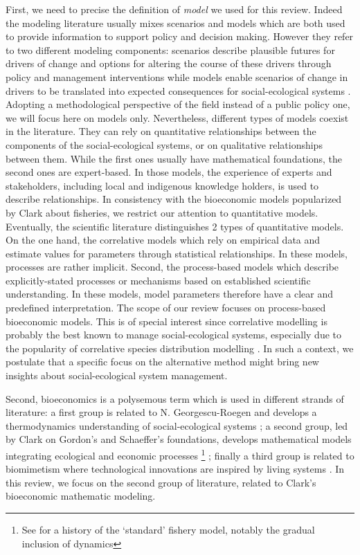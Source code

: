 First, we need to precise the definition of \textit{model} we used for this review. Indeed the modeling literature usually mixes scenarios and models which are  both used to provide information to support policy and decision making. However they refer to two different modeling components:
scenarios describe plausible futures for drivers of change and options for altering the course of these drivers through policy and management interventions while models enable scenarios of change in drivers to be
translated into expected consequences for social-ecological systems \citep{IPBES2016}. Adopting a methodological perspective of the field instead of a public policy one, we will focus here on models only. Nevertheless, different types of models coexist in the literature. They can rely on quantitative relationships between the components of the social-ecological systems, or on qualitative relationships between them. While the first ones usually have mathematical foundations, the second ones are expert-based. In those models, the experience of experts and stakeholders, including local and indigenous knowledge holders, is used to describe relationships. In consistency with the bioeconomic models popularized by Clark about fisheries, we restrict our attention to quantitative models.
Eventually, the scientific literature distinguishes 2 types of quantitative models. On the one hand, the correlative models which rely on empirical data and estimate values for parameters through statistical relationships. In these models, processes are rather implicit. Second, the process-based models which describe explicitly-stated processes or mechanisms based on established scientific understanding. In these models, model parameters therefore have a clear and predefined interpretation. The scope of our review focuses on process-based bioeconomic models. This is of special interest since correlative modelling  is probably the best known to manage social-ecological systems, especially due to the popularity of correlative species distribution modelling \citep{Elith2009}. In such a context, we postulate that a specific focus on the alternative method might bring new insights about social-ecological system management.



Second, bioeconomics is a polysemous term which is used in different strands of literature: a first group is related to  N. Georgescu-Roegen and develops a thermodynamics understanding of social-ecological systems \citep{GeorgescuRoegen}; a second group, led by Clark on Gordon's and Schaeffer's foundations, develops mathematical models integrating ecological and economic processes  \citep{Clark630, clark_profit_1973, Gordon1954, schaefer_some_1957}\footnote{See \cite{Parent_Mouysset_Missemer_Levrel_2024} for a history of the `standard' fishery model, notably the gradual inclusion of dynamics} ; finally a third group is related to biomimetism where technological innovations are inspired by living systems \citep{VANLANCKER201660}.
In this review, we focus  on the second group of literature, related to Clark's bioeconomic mathematic modeling.

